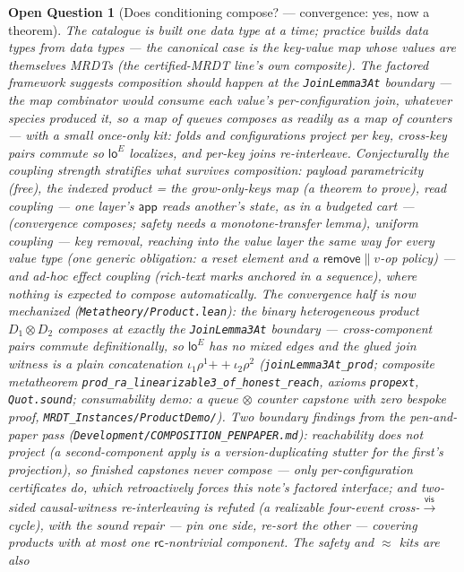 \documentclass[11pt]{article}
\newtheorem{openq}[theorem]{Open Question}
\newcommand{\vis}{\xrightarrow{\mathsf{vis}}}
\newcommand{\loE}[1]{\mathsf{lo}^{#1}}
\newcommand{\lean}[1]{\texttt{#1}}
\newcommand{\eqobs}{\approx}
\newcommand{\app}{\mathsf{app}}
\begin{document}
\begin{openq}[Does conditioning compose? --- convergence: yes, now a theorem]
\label{oq:compose}
The catalogue is built one data type at a time; practice builds data types
from data types --- the canonical case is the key-value map whose values are
themselves MRDTs (the certified-MRDT line's own composite). The factored
framework suggests composition should happen at the \lean{JoinLemma3At}
boundary --- the map combinator would consume each value's per-configuration
join, whatever species produced it, so a map of \emph{queues} composes as
readily as a map of counters --- with a small once-only kit: folds and
configurations project per key, cross-key pairs commute so $\loE{E}$
localizes, and per-key joins re-interleave. Conjecturally the coupling
strength stratifies what survives composition: payload parametricity (free),
the indexed product = the grow-only-keys map (a theorem to prove), read
coupling --- one layer's $\app$ reads another's state, as in a budgeted
cart --- (convergence composes; safety needs a monotone-transfer lemma),
uniform coupling --- key \emph{removal}, reaching into the value layer the
same way for every value type (one generic obligation: a reset element and
a $\mathsf{remove} \parallel v$-op policy) --- and ad-hoc effect coupling
(rich-text marks anchored in a sequence), where nothing is expected to
compose automatically. The convergence half is now mechanized
(\lean{Metatheory/Product.lean}): the binary heterogeneous product
$D_1 \otimes D_2$ composes at exactly the \lean{JoinLemma3At} boundary ---
cross-component pairs commute definitionally, so $\loE{E}$ has \emph{no}
mixed edges and the glued join witness is a plain concatenation
$\iota_1\rho^1 \mathbin{+\!\!+} \iota_2\rho^2$
(\lean{joinLemma3At\_prod}; composite metatheorem
\lean{prod\_ra\_linearizable3\_of\_honest\_reach}, axioms \lean{propext},
\lean{Quot.sound}; consumability demo: a queue $\otimes$ counter capstone
with zero bespoke proof, \lean{MRDT\_Instances/ProductDemo/}). Two
boundary findings from the pen-and-paper pass
(\lean{Development/COMPOSITION\_PENPAPER.md}): \emph{reachability does
not project} (a second-component apply is a version-duplicating stutter
for the first's projection), so finished capstones never compose ---
only per-configuration certificates do, which retroactively forces this
note's factored interface; and \emph{two-sided causal-witness
re-interleaving is refuted} (a realizable four-event cross-$\vis$ cycle),
with the sound repair --- pin one side, re-sort the other --- covering
products with at most one $\mathsf{rc}$-nontrivial component. The safety and $\eqobs$ kits are also

\end{openq}
\end{document}
